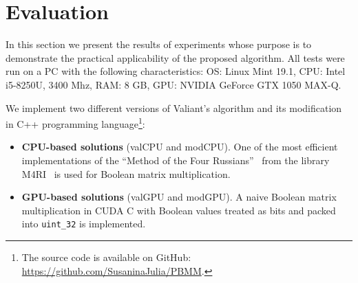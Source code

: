 \section{Evaluation}

In this section we present the results of experiments whose purpose is to demonstrate the practical applicability of the proposed algorithm. All tests were run on a PC with the following characteristics: OS: Linux Mint 19.1, CPU: Intel i5-8250U, 3400 Mhz, RAM: 8 GB, GPU: NVIDIA GeForce GTX 1050 MAX-Q.

We implement two different versions of Valiant's algorithm and its modification in C++ programming language\footnote{The source code is available on GitHub: \url{https://github.com/SusaninaJulia/PBMM}.}:

\begin{itemize}
    \item \textbf{CPU-based solutions} (\textsf{valCPU} and \textsf{modCPU}).
    One of the most efficient implementations of the “Method of the Four Russians”~\cite{arlazarov1970economical} from the library M4RI~\cite{Albrecht_2010} is used for Boolean matrix multiplication. 
    \item \textbf{GPU-based solutions} (\textsf{valGPU} and \textsf{modGPU}).
    A naive Boolean matrix multiplication in CUDA C with Boolean values treated as bits and packed into \texttt{uint\_32} is implemented.
\end{itemize}


